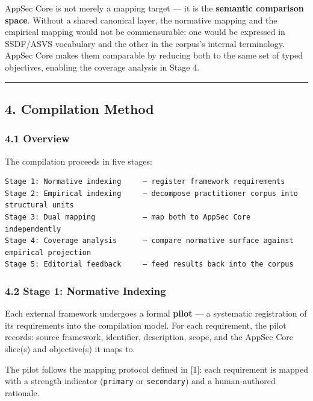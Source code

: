 \documentclass[
]{article}
\begin{document}
AppSec Core is not merely a mapping target --- it is the
\textbf{semantic comparison space}. Without a shared canonical layer,
the normative mapping and the empirical mapping would not be
commensurable: one would be expressed in SSDF/ASVS vocabulary and the
other in the corpus's internal terminology. AppSec Core makes them
comparable by reducing both to the same set of typed objectives,
enabling the coverage analysis in Stage 4.

\begin{center}\rule{0.5\linewidth}{0.5pt}\end{center}

\subsection{4. Compilation Method}\label{compilation-method}

\subsubsection{4.1 Overview}\label{overview}

The compilation proceeds in five stages:

\begin{verbatim}
Stage 1: Normative indexing     — register framework requirements
Stage 2: Empirical indexing     — decompose practitioner corpus into structural units
Stage 3: Dual mapping           — map both to AppSec Core independently
Stage 4: Coverage analysis      — compare normative surface against empirical projection
Stage 5: Editorial feedback     — feed results back into the corpus
\end{verbatim}

\subsubsection{4.2 Stage 1: Normative
Indexing}\label{stage-1-normative-indexing}

Each external framework undergoes a formal \textbf{pilot} --- a
systematic registration of its requirements into the compilation model.
For each requirement, the pilot records: source framework, identifier,
description, scope, and the AppSec Core slice(s) and objective(s) it
maps to.

The pilot follows the mapping protocol defined in {[}1{]}: each
requirement is mapped with a strength indicator (\texttt{primary} or
\texttt{secondary}) and a human-authored rationale.
\end{document}
